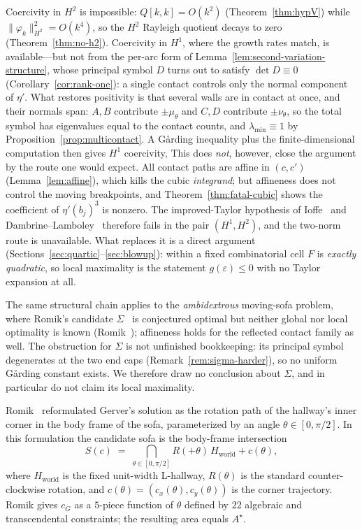 \documentclass[11pt]{amsart}
\theoremstyle{plain}
\theoremstyle{definition}
\newcommand{\cG}{c_{G}}
\newcommand{\Astar}{A^{\star}}
\newcommand{\Hworld}{H_{\mathrm{world}}}
\begin{document}
Coercivity in $H^{2}$ is impossible: $Q[k,k] = O(k^{2})$
(Theorem~\ref{thm:hypV}) while $\|\varphi_{k}\|_{H^{2}}^{2} =
O(k^{4})$, so the $H^{2}$ Rayleigh quotient decays to zero
(Theorem~\ref{thm:no-h2}).  Coercivity in $H^{1}$, where the growth
rates match, is available---but not from the per-arc form of
Lemma~\ref{lem:second-variation-structure}, whose principal symbol
$D$ turns out to satisfy $\det D\equiv0$
(Corollary~\ref{cor:rank-one}): a single contact controls only the
normal component of $\eta'$.  What restores positivity is that
several walls are in contact at once, and their normals span:
$A,B$ contribute $\pm\mu_{\theta}$ and $C,D$ contribute
$\pm\nu_{\theta}$, so the total symbol has eigenvalues equal to the
contact counts, and $\lambda_{\min}\equiv1$ by
Proposition~\ref{prop:multicontact}.  A G\aa rding inequality plus
the finite-dimensional computation then gives $H^{1}$ coercivity,
This does \emph{not}, however, close the argument by the route one
would expect.  All contact paths are affine in $(c,c')$
(Lemma~\ref{lem:affine}), which kills the cubic \emph{integrand}; but
affineness does not control the moving breakpoints, and
Theorem~\ref{thm:fatal-cubic} shows the coefficient of
$\eta'(b_{j})^{3}$ is nonzero.  The improved-Taylor hypothesis of
Ioffe~\cite{Ioffe1979} and Dambrine--Lamboley~\cite{DambrineLamboley}
therefore fails in the pair $(H^{1},H^{2})$, and the two-norm route is
unavailable.  What replaces it is a direct argument
(Sections~\ref{sec:quartic}--\ref{sec:blowup}): within a fixed
combinatorial cell $F$ is \emph{exactly quadratic}, so local
maximality is the statement $g(\varepsilon)\leq0$ with no Taylor
expansion at all.

The same structural chain applies to the \emph{ambidextrous}
moving-sofa problem, where Romik's candidate
$\Sigma$~\cite{Romik2018} is conjectured optimal but neither global
nor local optimality is known
(Romik~\cite[\S7, Open Problem~1]{Romik2018}); affineness holds for
the reflected contact family as well.  The obstruction for $\Sigma$ is
not unfinished bookkeeping: its principal symbol degenerates at the two
end caps (Remark~\ref{rem:sigma-harder}), so no uniform G\aa rding
constant exists.  We therefore draw no conclusion about $\Sigma$, and
in particular do not claim its local maximality.

Romik~\cite{Romik2018} reformulated Gerver's solution as the rotation
path of the hallway's inner corner in the body frame of the sofa,
parameterized by an angle $\theta \in [0, \pi/2]$.  In this
formulation the candidate sofa is the body-frame intersection
\begin{equation}\label{eq:S_x}
  S(c) \;=\; \bigcap_{\theta \in [0, \pi/2]}
              R(+\theta)\, \Hworld + c(\theta),
\end{equation}
where $\Hworld$ is the fixed unit-width L-hallway, $R(\theta)$ is the
standard counter-clockwise rotation, and $c(\theta) = (c_x(\theta),
c_y(\theta))$ is the corner trajectory.  Romik gives $\cG$ as a
$5$-piece function of $\theta$ defined by 22 algebraic and
transcendental constraints; the resulting area equals $\Astar$.
\end{document}
